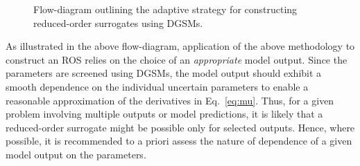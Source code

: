 \begin{figure}[htbp]
\begin{center}
\end{center}

\caption{Flow-diagram outlining the adaptive strategy for constructing reduced-order surrogates using
DGSMs.}
\label{fig:flow}
\end{figure}

As illustrated in the above flow-diagram, application of the above methodology to construct an ROS 
relies on the choice of an \textit{appropriate} model output. Since the parameters are screened
using DGSMs, the model output should exhibit a smooth dependence on the
individual uncertain parameters to enable a reasonable approximation of the derivatives in Eq.~\ref{eq:mu}.
Thus, for a given problem involving multiple outputs or model predictions, it is likely that a reduced-order 
surrogate might be possible only for selected outputs. Hence, where possible, it is recommended to a priori assess the
nature of dependence of a given model output on the parameters.

